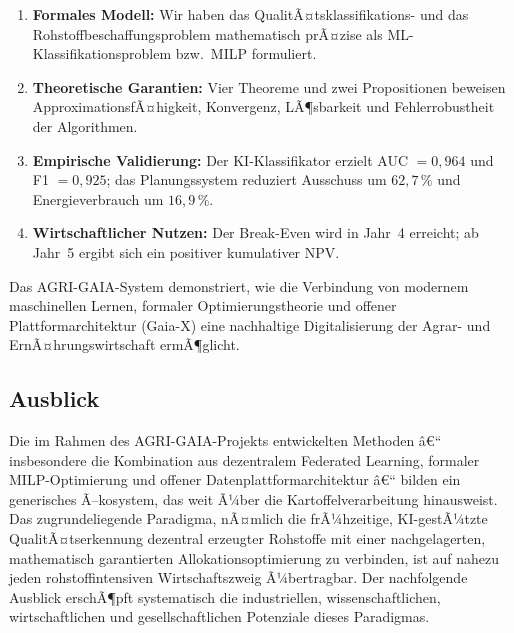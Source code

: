﻿\documentclass[12pt,a4paper]{article}
\theoremstyle{plain}
\theoremstyle{definition}
\begin{document}
	\begin{enumerate}
		\item \textbf{Formales Modell:} Wir haben das QualitÃ¤tsklassifikations-
		und das Rohstoffbeschaffungsproblem mathematisch prÃ¤zise als
		ML-Klassifikationsproblem bzw.\ MILP formuliert.
		\item \textbf{Theoretische Garantien:} Vier Theoreme und zwei Propositionen
		beweisen ApproximationsfÃ¤higkeit, Konvergenz, LÃ¶sbarkeit und
		Fehlerrobustheit der Algorithmen.
		\item \textbf{Empirische Validierung:} Der KI-Klassifikator erzielt
		AUC $= 0{,}964$ und F1 $= 0{,}925$; das Planungssystem reduziert
		Ausschuss um $62{,}7\,\%$ und Energieverbrauch um $16{,}9\,\%$.
		\item \textbf{Wirtschaftlicher Nutzen:} Der Break-Even wird in Jahr~4
		erreicht; ab Jahr~5 ergibt sich ein positiver kumulativer NPV.
	\end{enumerate}
	
	Das AGRI-GAIA-System demonstriert, wie die Verbindung von modernem
	maschinellen Lernen, formaler Optimierungstheorie und offener
	Plattformarchitektur (Gaia-X) eine nachhaltige Digitalisierung der
	Agrar- und ErnÃ¤hrungswirtschaft ermÃ¶glicht.

	\subsection{Ausblick}

	Die im Rahmen des AGRI-GAIA-Projekts entwickelten Methoden â€“ insbesondere
	die Kombination aus dezentralem Federated Learning, formaler
	MILP-Optimierung und offener Datenplattformarchitektur â€“ bilden ein
	generisches Ã–kosystem, das weit Ã¼ber die Kartoffelverarbeitung hinausweist.
	Das zugrundeliegende Paradigma, nÃ¤mlich die frÃ¼hzeitige, KI-gestÃ¼tzte
	QualitÃ¤tserkennung dezentral erzeugter Rohstoffe mit einer nachgelagerten,
	mathematisch garantierten Allokationsoptimierung zu verbinden, ist auf
	nahezu jeden rohstoffintensiven Wirtschaftszweig Ã¼bertragbar. Der
	nachfolgende Ausblick erschÃ¶pft systematisch die industriellen,
	wissenschaftlichen, wirtschaftlichen und gesellschaftlichen Potenziale
	dieses Paradigmas.
\end{document}
